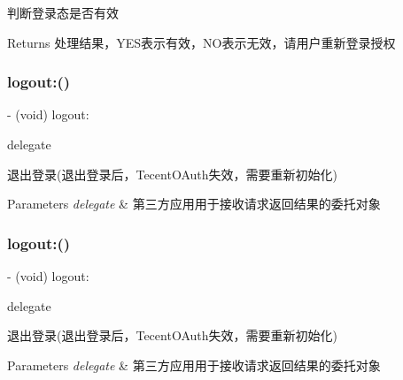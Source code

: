 判断登录态是否有效 \begin{DoxyReturn}{Returns}
处理结果，\+Y\+E\+S表示有效，\+N\+O表示无效，请用户重新登录授权 
\end{DoxyReturn}
\mbox{\label{interface_tencent_o_auth_a6f92b7e58f66ab4657107139c2d2f05b}} 
\subsubsection{\texorpdfstring{logout\+:()}{logout:()}\hspace{0.1cm}{\footnotesize\ttfamily [1/2]}}
{\footnotesize\ttfamily -\/ (void) logout\+: \begin{DoxyParamCaption}\item[{(id$<$ \mbox{\hyperlink{protocol_tencent_session_delegate-p}{Tencent\+Session\+Delegate}} $>$)}]{delegate }\end{DoxyParamCaption}}

退出登录(退出登录后，\+Tecent\+O\+Auth失效，需要重新初始化) 
\begin{DoxyParams}{Parameters}
{\em delegate} & 第三方应用用于接收请求返回结果的委托对象 \\
\hline
\end{DoxyParams}
\mbox{\label{interface_tencent_o_auth_a6f92b7e58f66ab4657107139c2d2f05b}} 
\subsubsection{\texorpdfstring{logout\+:()}{logout:()}\hspace{0.1cm}{\footnotesize\ttfamily [2/2]}}
{\footnotesize\ttfamily -\/ (void) logout\+: \begin{DoxyParamCaption}\item[{(id$<$ \mbox{\hyperlink{protocol_tencent_session_delegate-p}{Tencent\+Session\+Delegate}} $>$)}]{delegate }\end{DoxyParamCaption}}

退出登录(退出登录后，\+Tecent\+O\+Auth失效，需要重新初始化) 
\begin{DoxyParams}{Parameters}
{\em delegate} & 第三方应用用于接收请求返回结果的委托对象 \\
\hline
\end{DoxyParams}
\mbox{\label{interface_tencent_o_auth_aafe5fa40dc8b6ff0f7bb3d72bbecd663}} 
